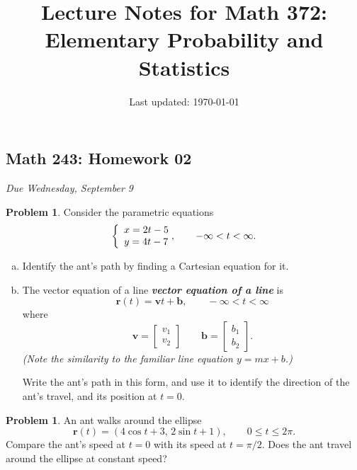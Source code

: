 \documentclass[10pt]{article}
\title{Lecture Notes for Math 372: \\Elementary Probability and Statistics}
\date{Last updated: \today}
\theoremstyle{definition}
\newtheorem{problem}[theorem]{Problem}
\newcommand{\1}[1]{\textbf{1}_{\left[#1\right]}} %
\DeclareRobustCommand{\demph}[1]{%
  \ifmmode
  {\color{Blue}#1}%
  \else
  {\color{Blue}\bfseries\slshape #1}%
  \fi
}
\begin{document}
\begin{center}
  \section*{Math 243: Homework 02}
  \textit{Due Wednesday, September 9}
\end{center}

\begin{problem}
  Consider the parametric equations
  \begin{equation*}
    \left\{ \begin{array}{l@{}l} x=2t-5 \\ y=4t-7 \end{array}\right., \qquad -\infty<t<\infty.
  \end{equation*}
  \begin{enumerate}[(a)]
    \item Identify the ant's path by finding a Cartesian equation for it.
    \vspace{2in}
    \item The \demph{vector equation of a line} is
    \begin{equation*}
      \mathbf{r}(t) = \mathbf{v}t+\mathbf{b}, \qquad -\infty<t<\infty
    \end{equation*}
    where
    \begin{equation*}
      \mathbf{v}=
      \begin{bmatrix}
        v_{1}\\v_{2}
      \end{bmatrix}
      \qquad  \mathbf{b}=
      \begin{bmatrix}
        b_{1}\\b_{2}
      \end{bmatrix}.    
    \end{equation*}
    \textit{(Note the similarity to the familiar line equation $y=mx+b$.)}

    Write the ant's path in this form, and use it to identify the direction of
    the ant's travel, and its position at $t=0$.
    \vspace{1in}
  \end{enumerate}
\end{problem}

\begin{problem}
  An ant walks around the ellipse
  \[
    \mathbf r(t)=(4\cos t+3,\,2\sin t+1),
    \qquad 0\leq t\leq2\pi.
  \]
  Compare the ant's speed at $t=0$ with its speed at $t=\pi/2$. Does the ant
  travel around the ellipse at constant speed?
\end{problem}
\vspace{1.5in}
\end{document}
